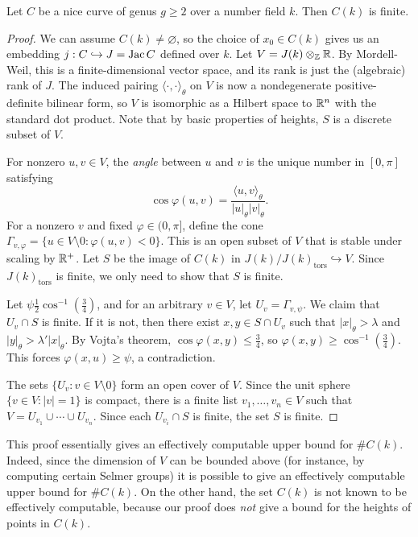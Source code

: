 \documentclass{article}
\begin{document}
\begin{theorem}[Faltings]
Let $C$ be a nice curve of genus $g\geqslant 2$ over a number field $k$. Then 
$C(k)$ is finite.
\end{theorem}
\begin{proof}
We can assume $C(k)\ne\varnothing$, so the choice of $x_0\in C(k)$ gives us an 
embedding $j:C\hookrightarrow J=\operatorname{Jac} C$ defined over $k$. Let 
$V=J(k)\otimes_{\mathbb{Z}}\mathbb{R}$. By Mordell-Weil, this is a finite-dimensional 
vector space, and its rank is just the (algebraic) rank of $J$. The induced 
pairing $\langle\cdot,\cdot\rangle_\theta$ on $V$ is now a nondegenerate 
positive-definite bilinear form, so $V$ is isomorphic as a Hilbert space to 
$\mathbb{R}^n$ with the standard dot product. Note that by basic properties of 
heights, $S$ is a discrete subset of $V$. 

For nonzero $u,v\in V$, the \emph{angle} between $u$ and $v$ is the unique 
number in $[0,\pi]$ satisfying 
\[
  \cos\varphi(u,v) = \frac{\langle u,v\rangle_\theta}{|u|_\theta |v|_\theta} \text{.}
\]
For a nonzero $v$ and fixed $\varphi\in (0,\pi]$, define the cone 
$\Gamma_{v,\varphi} = \{u\in V\setminus 0 : \varphi(u,v)<0\}$. This is an open 
subset of $V$ that is stable under scaling by $\mathbb{R}^+$. Let $S$ be the image of 
$C(k)$ in $J(k)/J(k)_\text{tors}\hookrightarrow V$. Since $J(k)_\text{tors}$ is 
finite, we only need to show that $S$ is finite. 

Let $\psi\frac 1 2 \cos^{-1}(\frac 3 4)$, and for an arbitrary $v\in V$, let 
$U_v=\Gamma_{v,\psi}$. We claim that $U_v\cap S$ is finite. If it is not, 
then there exist $x,y\in S\cap U_v$  such that $|x|_\theta>\lambda$ and 
$|y|_\theta>\lambda'|x|_\theta$. By Vojta's theorem, 
$\cos\varphi(x,y)\leqslant \frac 3 4$, so 
$\varphi(x,y)\geqslant \cos^{-1}(\frac 3 4)$. This forces 
$\varphi(x,u)\geqslant \psi$, a contradiction. 

The sets $\{U_v:v\in V\setminus 0\}$ form an open cover of $V$. Since the unit 
sphere $\{v\in V:|v|=1\}$ is compact, there is a finite list 
$v_1,\dots,v_n\in V$ such that $V=U_{v_1}\cup \cdots \cup U_{v_n}$. Since each 
$U_{v_i}\cap S$ is finite, the set $S$ is finite. 
\end{proof}

This proof essentially gives an effectively computable upper bound for 
$\# C(k)$. Indeed, since the dimension of $V$ can be bounded above (for 
instance, by computing certain Selmer groups) it is possible to give an 
effectively computable upper bound for $\# C(k)$. On the other hand, the set 
$C(k)$ is not known to be effectively computable, because our proof does 
\emph{not} give a bound for the heights of points in $C(k)$.
\end{document}
